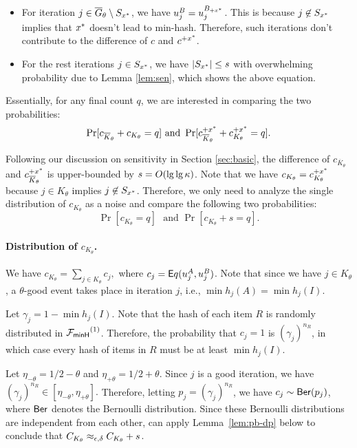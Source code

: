 \begin{itemize}
\item For iteration $j\in \overline{G}_\theta \setminus S_{\xs}$, we have $u^B_j
= u^{\Bp}_j$. This is because $j \not \in S_{\xs}$ implies that $\xs$
doesn't lead to min-hash.  Therefore, such iterations don't
contribute to the difference of $c$ and $c^{\xp}$. 

\item For the rest iterations $j \in S_{\xs}$, we have $|S_{\xs}| \le s$ with overwhelming probability due to Lemma \ref{lem:sen}, which
shows the above equation. 
\end{itemize}
\fi


Essentially, for any final count $q$, we are interested in comparing the two
probabilities: 
%
\[\Pr[c_{\overline K_\theta} + c_{K_\theta} = q] \mbox{~and~}
\Pr[c^{\xp}_{\overline K_\theta} + c^{\xp}_{K_\theta} = q].\]

Following our discussion on sensitivity in Section \ref{sec:basic},  the
difference of $c_{\overline K_\theta}$ and $c^{\xp}_{\overline K_\theta}$
is upper-bounded by $s = O(\lg\lg \secparam)$. 
%
Note that we have $c_{K_\theta} = c^{\xp}_{K_\theta}$ because $j \in K_\theta$
implies $j \not \in S_{\xs}$. Therefore, we only need to analyze the single distribution of
$c_{K_\theta}$ as a noise and compare the following two probabilities:
%
\[\Pr[c_{K_\theta} = q] \mbox{~~and~}
\Pr[c_{K_\theta}+s = q].\]

\paragraph{Distribution of $c_{K_\theta}$.}
We have $c_{K_\theta} = \sum_{j \in K_\theta} c_j,$ where $c_j = {\sf Eq}(u_j^A, u_j^B)$. 
Note that since we have $j \in K_\theta$, a $\theta$-good event takes place in
iteration $j$, i.e., $\min h_j(A) = \min h_j(I)$. 

Let $\gamma_j = 1 - \min h_j(I)$. Note that the hash of each item $R$ is
randomly distributed in  $\Pbase^{(1)}$. Therefore, the probability that $c_j = 1$
is $(\gamma_j)^{n_R}$, in which case every hash of items in $R$ must be at least $\min h_j(I)$. 


%
Let $\eta_{-\theta} = 1/2-\theta$ and $\eta_{+\theta}= 1/2+\theta.$ Since $j$ is a good iteration, we have 
$(\gamma_j)^{n_R} \in [\eta_{-\theta}, \eta_{+\theta}].$
Therefore, letting $p_j = (\gamma_j)^{n_R}$, we have $c_j \sim \Ber(p_j)$, where
$\Ber$ denotes the Bernoulli distribution.  %
Since these Bernoulli distributions are independent from each other, 
can apply Lemma~\ref{lem:pb-dp} below to conclude that $C_{K_\theta} \aed
C_{K_\theta}+s$. 


